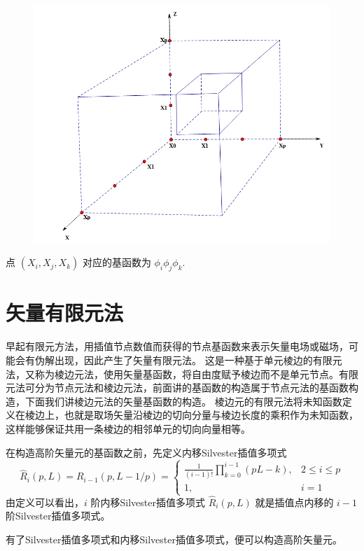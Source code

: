 \documentclass[12pt,a4paper]{article}
\begin{document}
\begin{figure}[H]
\centering
\includegraphics[scale=0.7]{./figures/10.png}
\caption{}
\end{figure}

点 $(X_i ,X_j ,X_k)$ 对应的基函数为 $\phi_i\phi_j\phi_k$.

\section{矢量有限元法}
早起有限元方法，用插值节点数值而获得的节点基函数来表示矢量电场或磁场，可能会有伪解出现，因此产生了矢量有限元法。
这是一种基于单元棱边的有限元法，又称为棱边元法，使用矢量基函数，将自由度赋予棱边而不是单元节点。有限元法可分为节点元法和棱边元法，前面讲的基函数的构造属于节点元法的基函数构造，下面我们讲棱边元法的矢量基函数的构造。
棱边元的有限元法将未知函数定义在棱边上，也就是取场矢量沿棱边的切向分量与棱边长度的乘积作为未知函数，这样能够保证共用一条棱边的相邻单元的切向向量相等。

在构造高阶矢量元的基函数之前，先定义内移Silvester插值多项式
$$
\hat{R}_i (p,L)=R_{i-1}(p,L-1/p)=\begin{cases}
\frac{1}{(i-1)!}\prod_{k=0}^{i-1} (pL-k), & 2 \leqslant i \leqslant p\\
1, & i=1
\end{cases}
$$
由定义可以看出，$i$ 阶内移Silvester插值多项式 $\hat{R}_i (p,L)$ 就是插值点内移的 $i-1$ 阶Silvester插值多项式。

有了Silvester插值多项式和内移Silvester插值多项式，便可以构造高阶矢量元。
\end{document}
